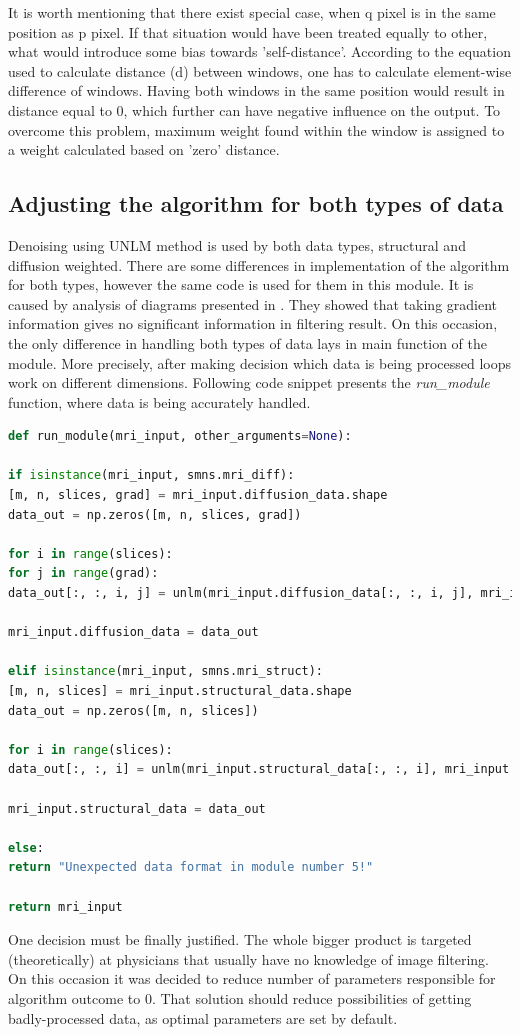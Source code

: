 It is worth mentioning that there exist special case, when q pixel is in the same position as p pixel. If that situation would have been treated equally to other, what would introduce some bias towards 'self-distance'. According to the equation used to calculate distance (d) between windows, one has to calculate element-wise difference of windows. Having both windows in the same position would result in distance equal to 0, which further can have negative influence on the output. To overcome this problem, maximum weight found within the window is assigned to a weight calculated based on 'zero' distance.


\subsection*{Adjusting the algorithm for both types of data}
Denoising using UNLM method is used by both data types, structural and diffusion weighted. There are some differences in implementation of the algorithm for both types, however the same code is used for them in this module. It is caused by analysis of diagrams presented in \cite{5a2}. They showed that taking gradient information gives no significant information in filtering result. On this occasion, the only difference in handling both types of data lays in main function of the module. More precisely, after making decision which data is being processed loops work on different dimensions. Following code snippet presents the \textit{run\_module} function, where data is being accurately handled.

\begin{lstlisting}[language=Python, caption = run\_module function.]
def run_module(mri_input, other_arguments=None):

if isinstance(mri_input, smns.mri_diff):
[m, n, slices, grad] = mri_input.diffusion_data.shape
data_out = np.zeros([m, n, slices, grad])

for i in range(slices):
for j in range(grad):
data_out[:, :, i, j] = unlm(mri_input.diffusion_data[:, :, i, j], mri_input.noise_map[:, :, i, j])

mri_input.diffusion_data = data_out

elif isinstance(mri_input, smns.mri_struct):
[m, n, slices] = mri_input.structural_data.shape
data_out = np.zeros([m, n, slices])

for i in range(slices):
data_out[:, :, i] = unlm(mri_input.structural_data[:, :, i], mri_input.noise_map[:, :, i])

mri_input.structural_data = data_out

else:
return "Unexpected data format in module number 5!"

return mri_input
\end{lstlisting}

One decision must be finally justified. The whole bigger product is targeted (theoretically) at physicians that usually have no knowledge of image filtering. On this occasion it was decided to reduce number of parameters responsible for algorithm outcome to 0. That solution should reduce possibilities of getting badly-processed data, as optimal parameters are set by default.
